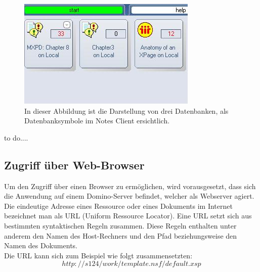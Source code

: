 \begin{figure}[H]
    \centerline{\includegraphics[scale=0.5]{pics/Client_kacheln}}
    \caption[Darstellung einer Datenbank im Notes Client]{\label{FiG:Darstellung einer Datenbank im Notes Client}
	In dieser Abbildung ist die Darstellung von drei Datenbanken, als Datenbanksymbole im Notes Client ersichtlich.}
\end{figure}



to do....%



\subsection{Zugriff über Web-Browser}
\label{sec:5webzugriff}

Um den Zugriff über einen Browser zu ermöglichen, wird vorausgesetzt, dass sich die Anwendung auf einem Domino-Server befindet, welcher als Webserver
agiert\cite{ebel}.
Die eindeutige Adresse eines Ressource oder eines Dokuments im Internet bezeichnet man als URL (Uniform Ressource Locator). Eine URL setzt sich aus 
bestimmten syntaktischen Regeln zusammen. Diese Regeln enthalten unter anderem den Namen des Host-Rechners und den Pfad beziehungsweise
den Namen des Dokuments\cite{knaepper}.\\
Die URL kann sich zum Beispiel wie folgt zusammensetzten:
\begin{equation}
http://s124/work/template.nsf/default.xsp
\end{equation} 


